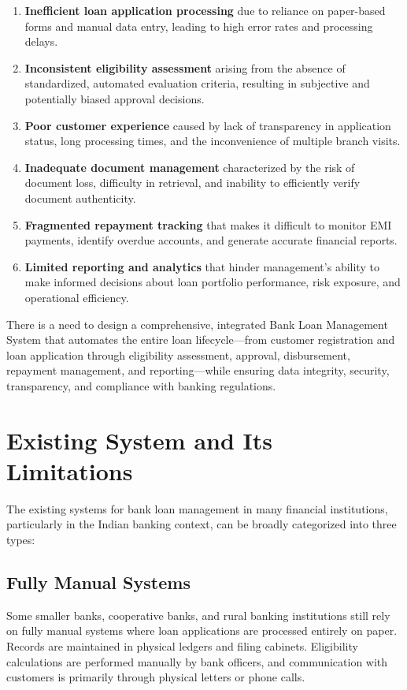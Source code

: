 \begin{enumerate}
  \item \textbf{Inefficient loan application processing} due to reliance on paper-based forms and manual data entry, leading to high error rates and processing delays.
  \item \textbf{Inconsistent eligibility assessment} arising from the absence of standardized, automated evaluation criteria, resulting in subjective and potentially biased approval decisions.
  \item \textbf{Poor customer experience} caused by lack of transparency in application status, long processing times, and the inconvenience of multiple branch visits.
  \item \textbf{Inadequate document management} characterized by the risk of document loss, difficulty in retrieval, and inability to efficiently verify document authenticity.
  \item \textbf{Fragmented repayment tracking} that makes it difficult to monitor EMI payments, identify overdue accounts, and generate accurate financial reports.
  \item \textbf{Limited reporting and analytics} that hinder management's ability to make informed decisions about loan portfolio performance, risk exposure, and operational efficiency.
\end{enumerate}

There is a need to design a comprehensive, integrated Bank Loan Management System that automates the entire loan lifecycle—from customer registration and loan application through eligibility assessment, approval, disbursement, repayment management, and reporting—while ensuring data integrity, security, transparency, and compliance with banking regulations.

\section{Existing System and Its Limitations}

The existing systems for bank loan management in many financial institutions, particularly in the Indian banking context, can be broadly categorized into three types:

\subsection{Fully Manual Systems}

Some smaller banks, cooperative banks, and rural banking institutions still rely on fully manual systems where loan applications are processed entirely on paper. Records are maintained in physical ledgers and filing cabinets. Eligibility calculations are performed manually by bank officers, and communication with customers is primarily through physical letters or phone calls.

